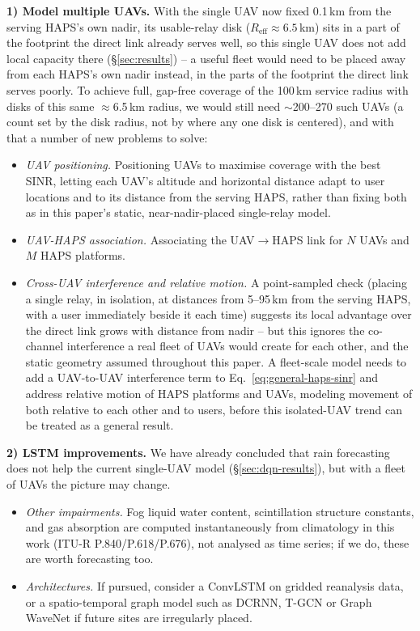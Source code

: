 \documentclass[]{ieeeaccess}
\begin{document}
\textbf{1) Model multiple UAVs.} With the single UAV now fixed 0.1\,km from the serving HAPS's own nadir, its usable-relay disk ($R_\mathrm{eff}\approx6.5$\,km) sits in a part of the footprint the direct link already serves well, so this single UAV does not add local capacity there (\S\ref{sec:results}) -- a useful fleet would need to be placed away from each HAPS's own nadir instead, in the parts of the footprint the direct link serves poorly. To achieve full, gap-free coverage of the 100\,km service radius with disks of this same $\approx$6.5\,km radius, we would still need $\sim$200--270 such UAVs (a count set by the disk radius, not by where any one disk is centered), and with that a number of new problems to solve:
\begin{itemize}\setlength{\itemsep}{1pt}
  \item \emph{UAV positioning.} Positioning UAVs to maximise coverage with the best SINR, letting each UAV's altitude and horizontal distance adapt to user locations and to its distance from the serving HAPS, rather than fixing both as in this paper's static, near-nadir-placed single-relay model.
  \item \emph{UAV-HAPS association.} Associating the UAV$\to$HAPS link for $N$ UAVs and $M$ HAPS platforms.
  \item \emph{Cross-UAV interference and relative motion.} A point-sampled check (placing a single relay, in isolation, at distances from 5--95\,km from the serving HAPS, with a user immediately beside it each time) suggests its local advantage over the direct link grows with distance from nadir -- but this ignores the co-channel interference a real fleet of UAVs would create for each other, and the static geometry assumed throughout this paper. A fleet-scale model needs to add a UAV-to-UAV interference term to Eq.~\eqref{eq:general-haps-sinr} and address relative motion of HAPS platforms and UAVs, modeling movement of both relative to each other and to users, before this isolated-UAV trend can be treated as a general result.
\end{itemize}

\textbf{2) LSTM improvements.} We have already concluded that rain forecasting does not help the current single-UAV model (\S\ref{sec:dqn-results}), but with a fleet of UAVs the picture may change.
\begin{itemize}\setlength{\itemsep}{1pt}
  \item \emph{Other impairments.} Fog liquid water content, scintillation structure constants, and gas absorption are computed instantaneously from climatology in this work (ITU-R P.840/P.618/P.676), not analysed as time series; if we do, these are worth forecasting too.
  \item \emph{Architectures.} If pursued, consider a ConvLSTM on gridded reanalysis data, or a spatio-temporal graph model such as DCRNN, T-GCN or Graph WaveNet if future sites are irregularly placed.
\end{itemize}
\end{document}
